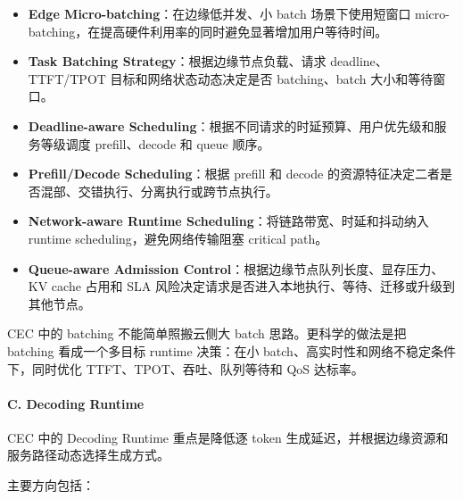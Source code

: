 \documentclass[a4paper,twocolumn,10pt]{ctexart}
\begin{document}
\begin{itemize}
\item \textbf{Edge Micro-batching}：在边缘低并发、小 batch 场景下使用短窗口 micro-batching，在提高硬件利用率的同时避免显著增加用户等待时间。

\item \textbf{Task Batching Strategy}：根据边缘节点负载、请求 deadline、TTFT/TPOT 目标和网络状态动态决定是否 batching、batch 大小和等待窗口。

\item \textbf{Deadline-aware Scheduling}：根据不同请求的时延预算、用户优先级和服务等级调度 prefill、decode 和 queue 顺序。

\item \textbf{Prefill/Decode Scheduling}：根据 prefill 和 decode 的资源特征决定二者是否混部、交错执行、分离执行或跨节点执行。

\item \textbf{Network-aware Runtime Scheduling}：将链路带宽、时延和抖动纳入 runtime scheduling，避免网络传输阻塞 critical path。

\item \textbf{Queue-aware Admission Control}：根据边缘节点队列长度、显存压力、KV cache 占用和 SLA 风险决定请求是否进入本地执行、等待、迁移或升级到其他节点。



\end{itemize}
CEC 中的 batching 不能简单照搬云侧大 batch 思路。更科学的做法是把 batching 看成一个多目标 runtime 决策：在小 batch、高实时性和网络不稳定条件下，同时优化 TTFT、TPOT、吞吐、队列等待和 QoS 达标率。




\paragraph*{C. Decoding Runtime}



CEC 中的 Decoding Runtime 重点是降低逐 token 生成延迟，并根据边缘资源和服务路径动态选择生成方式。




主要方向包括：
\end{document}
